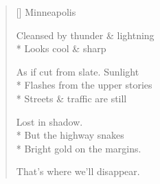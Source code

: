 \label{ch:driving_cross_country}
\settowidth{\versewidth}{As if cut from slate.   Sunlight}
\begin{verse}[\versewidth]
Minneapolis

Cleansed by thunder \& lightning\\*
Looks cool \& sharp

As if cut from slate.   Sunlight\\*
Flashes from the upper stories\\*
Streets \& traffic are still

Lost in shadow.\\*
But the highway snakes\\*
Bright gold on the margins.

That's where we'll disappear.
\end{verse}
